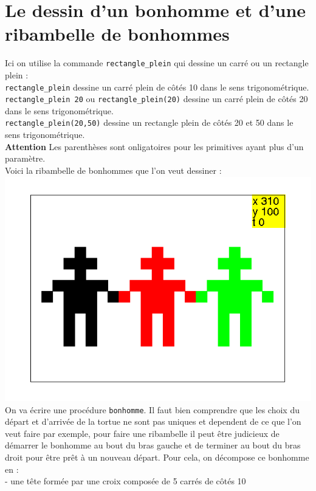 \documentclass[a4paper,11pt]{book}
\begin{document}
\section{Le dessin d'un  bonhomme et d'une ribambelle de bonhommes}
Ici on utilise la commande {\tt rectangle\_plein} qui dessine un carr\'e ou 
un rectangle plein :\\
{\tt rectangle\_plein} dessine un carr\'e plein de c\^ot\'es 10 dans le sens 
trigonom\'etrique.\\
{\tt rectangle\_plein 20} ou {\tt rectangle\_plein(20)} dessine un carr\'e  
plein de c\^ot\'es 20 dans le sens trigonom\'etrique.\\
{\tt rectangle\_plein(20,50)} dessine un rectangle plein de 
c\^ot\'es 20 et 50 dans le sens trigonom\'etrique.\\
{\bf Attention}
Les parenth\`eses sont onligatoires pour les primitives ayant plus d'un 
param\`etre.\\
Voici la ribambelle de bonhommes que l'on veut dessiner :\\
%
 \includegraphics[width=\textwidth]{tortbon}
On va \'ecrire une proc\'edure {\tt bonhomme}. Il faut bien comprendre que les 
choix du d\'epart et d'arriv\'ee de la tortue ne sont pas uniques et dependent 
de ce que l'on veut faire par 
exemple, pour faire une ribambelle il 
peut \^etre judicieux de d\'emarrer le bonhomme au
bout du bras gauche et de terminer au bout du bras droit pour \^etre pr\^et 
\`a un nouveau d\'epart. Pour cela,
on d\'ecompose ce bonhomme en :\\
- une t\^ete form\'ee par une croix compos\'ee de 5 carr\'es de c\^ot\'es 10 
\end{document}
